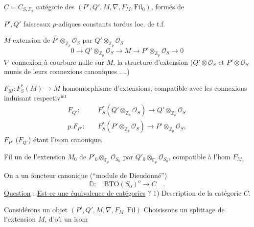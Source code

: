 $C=C_{S,F_S}$ catégorie des   $(P',Q',M,\nabla,F_M,\mathrm{Fil}_0)$, formés de

$P',Q'$ faisceaux $p$-adiques constants tordus  loc.  de t.f. 

$M$ extension de $P'\otimes_{\mathbb Z_p}\mathcal O_S$ par $Q'\otimes_{\mathbb Z_p}\mathcal O_S$
\[
0\longrightarrow Q'\otimes_{\mathbb Z_p}\mathcal O_S\longrightarrow M\longrightarrow P'\otimes_{\mathbb Z_p}\mathcal O_S\longrightarrow0
\]
$\nabla$ connexion à courbure nulle sur $M$,   la structure d'extension ($Q'\otimes\mathcal O_S$ et $P'\otimes\mathcal O_S$ munis de leurs connexions canoniques ....)

$F_M:F_S^*(M)\longrightarrow M$ homomorphisme d'extensions, compatible avec les connexions induisant  respectiv$^{\mathrm{mt}}$
\[
\begin{aligned}
F_{Q'}:\quad& F_S^*(Q'\otimes_{\mathbb Z_p}\mathcal O_S)\longrightarrow Q'\otimes_{\mathbb Z_p}\mathcal O_S\\
p.F_{P'}:\quad& F_S^*(P'\otimes_{\mathbb Z_p}\mathcal O_S)\longrightarrow P'\otimes_{\mathbb Z_p}\mathcal O_S,
\end{aligned}
\]
$F_{P'}$ ($F_{Q'}$) étant l'isom canonique.

Fil un   de l'extension $M_0$ de $P'_0\otimes_{\mathbb F_p}\mathcal O_{S_0}$ par $Q'_0\otimes_{\mathbb F_p}\mathcal O_{S_0}$, compatible à l'hom $F_{M_0}$

On a un foncteur canonique (``module de Dieudonné'')
\[
\mathbb D:\quad\mathrm{BTO}(S_0)^o\longrightarrow C\quad .
\]
\uline{Question} : \uline{Est-ce une équivalence de catégories} ?
1) Description de la catégorie $C$.

Considérons un objet $(P',Q',M,\nabla,F_M,\mathrm{Fil})$  Choisissons un splittage de l'extension $M$, d'où un isom

